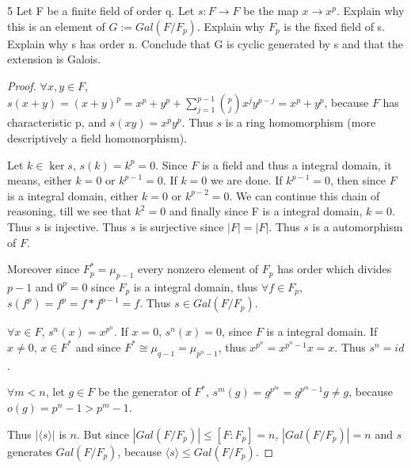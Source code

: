\documentclass{article}
\newcommand{\angles}[1]{\langle #1 \rangle}
\begin{document}
\begin{PROB}{5}\label{Problem 5.}
    Let F be a finite field of order q. Let  $s: F \to F$ be the map $x \to x^p$. Explain why this is an element of $G := Gal(F/F_p)$.  Explain why $F_p$ is the fixed field of s.  Explain why s has order n. Conclude that G is cyclic generated by s and that the extension is Galois. 
\end{PROB}
\begin{proof}

    $\forall x, y \in F$, $s(x + y) = (x + y)^p = x^p + y^p + \sum_{j = 1}^{p - 1} {p \choose j}x^j y^{p - j} = x^p + y^p$, because $F$ has characteristic p, and $s(xy) = x^p y^p$. Thus $s$ is a ring homomorphism (more descriptively a field homomorphism).    

    Let $k \in \ker s$, $s(k) = k^p = 0$. Since $F$ is a field and thus a integral domain, it means, either $k = 0$ or $k^{p - 1} = 0$. If $k = 0$ we are done. If $k^{p - 1} = 0$, then since $F$ is a integral domain, either $k = 0$ or $k^{p - 2} = 0$. We can continue this chain of reasoning, till we see that $k^2 = 0$ and finally since F is a integral domain, $k = 0$. Thus $s$ is injective. Thus $s$ is surjective since $|F| = |F|$. Thus $s$ is a automorphism of $F$. 
    
    Moreover since $F_p^* = \mu_{p - 1}$ every nonzero element of $F_p$ has order which divides $p - 1$ and $0^p = 0$ since $F_p$ is a integral domain, thus $\forall f \in F_p$, $s(f^p) = f^p = f * f^{p - 1} = f$. Thus $s \in Gal(F / F_p)$. 
    
    $\forall x \in F$, $s^n(x) = x^{p^n}$. If $x = 0$, $s^n(x) = 0$, since $F$ is a integral domain. If $x \neq 0$, $x \in F^*$ and since $F^* \cong \mu_{q - 1} = \mu_{p^n - 1}$, thus $x^{p^n} = x^{p^n - 1} x = x$. Thus $s^n = id$.
    
    $\forall m < n$, let $g \in F$ be the generator of $F^*$, $s^m(g) = g^{p^m} = g^{p^m - 1} g \neq g$, because $o(g) = p^n - 1 > p^m - 1$.

    Thus $|\angles{s}|$ is $n$. But since $|Gal(F / F_p)| \leq [F : F_p] = n$, $|Gal(F / F_p)| = n$ and $s$ generates $Gal(F / F_p)$, because $\angles{s} \leq Gal(F / F_p)$.     

\end{proof}

\bigskip
\end{document}
